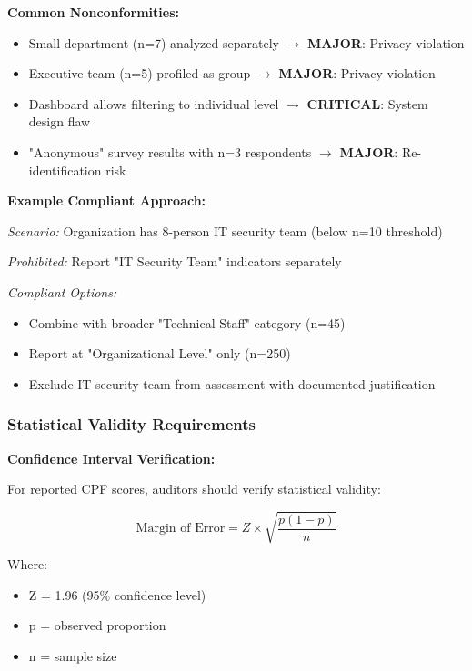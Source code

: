 \documentclass[11pt,a4paper]{article}
\begin{document}
\textbf{Common Nonconformities:}

\begin{itemize}
\item Small department (n=7) analyzed separately $\rightarrow$ \textbf{MAJOR}: Privacy violation
\item Executive team (n=5) profiled as group $\rightarrow$ \textbf{MAJOR}: Privacy violation
\item Dashboard allows filtering to individual level $\rightarrow$ \textbf{CRITICAL}: System design flaw
\item "Anonymous" survey results with n=3 respondents $\rightarrow$ \textbf{MAJOR}: Re-identification risk
\end{itemize}

\textbf{Example Compliant Approach:}

\textit{Scenario:} Organization has 8-person IT security team (below n=10 threshold)

\textit{Prohibited:} Report "IT Security Team" indicators separately

\textit{Compliant Options:}
\begin{itemize}
\item Combine with broader "Technical Staff" category (n=45)
\item Report at "Organizational Level" only (n=250)
\item Exclude IT security team from assessment with documented justification
\end{itemize}

\subsubsection{Statistical Validity Requirements}

\textbf{Confidence Interval Verification:}

For reported CPF scores, auditors should verify statistical validity:

\begin{equation}
\text{Margin of Error} = Z \times \sqrt{\frac{p(1-p)}{n}}
\end{equation}

Where:
\begin{itemize}
\item Z = 1.96 (95\% confidence level)
\item p = observed proportion
\item n = sample size
\end{itemize}
\end{document}
